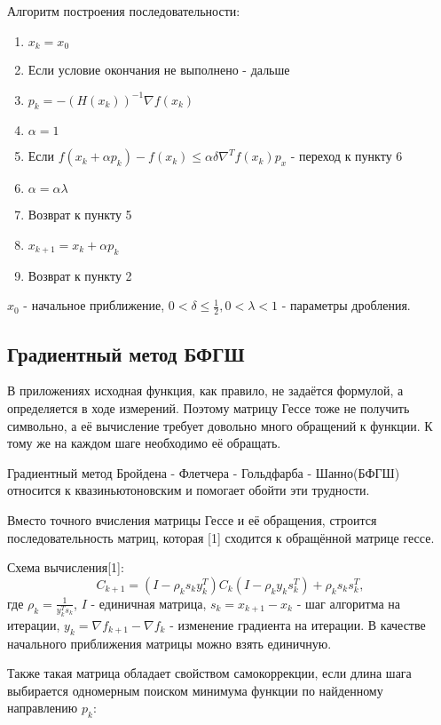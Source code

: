 Алгоритм построения последовательности:
\begin{enumerate}
    \item $x_k = x_0$
    \item Если условие окончания не выполнено - дальше
    \item $p_k = -(H(x_k))^{-1}{\nabla}f(x_k)$
    \item $\alpha = 1$
    \item Если $f(x_k + \alpha p_k) - f(x_k) \leq \alpha \delta \nabla^{T}f(x_k)p_x$ - переход к пункту 6
    \item $\alpha = \alpha \lambda$
    \item Возврат к пункту 5
    \item $x_{k+1} = x_k + \alpha p_k$
    \item Возврат к пункту 2
\end{enumerate}
$x_0$ - начальное приближение, $0 <\delta\leq \frac{1}{2}, 0 <\lambda <1$ - параметры дробления.

\subsection{Градиентный метод БФГШ}
\label{subsec:theory_bfgs}
В приложениях исходная функция, как правило, не задаётся формулой, а определяется в ходе измерений.
Поэтому матрицу Гессе тоже не получить символьно, а её вычисление требует довольно много обращений к функции.
К тому же на каждом шаге необходимо её обращать.

Градиентный метод Бройдена - Флетчера - Гольдфарба - Шанно(БФГШ) относится к квазиньютоновским и помогает обойти эти трудности.

Вместо точного вчисления матрицы Гессе и её обращения, строится последовательность матриц, которая  [1] сходится к обращённой матрице гессе.

Схема вычисления[1]:
\begin{equation}
C_{k + 1} = (I - \rho_k s_k y_k^T)C_k(I - \rho_k y_k s_k^T) + \rho_k s_k s_k^T,
\label{eq:bfgs_mat}
\end{equation}
где $\rho_k = \frac{1}{y_k^T s_k}$, $I$ - единичная матрица, $s_k = x_{k + 1} - x_k$ - шаг алгоритма на итерации, $y_k = \nabla f_{k + 1} - \nabla f_{k}$ - изменение градиента на итерации.
В качестве начального приближения матрицы можно взять единичную.

Также такая матрица обладает свойством самокоррекции, если длина шага выбирается одномерным поиском минимума функции по найденному направлению $p_k$:

